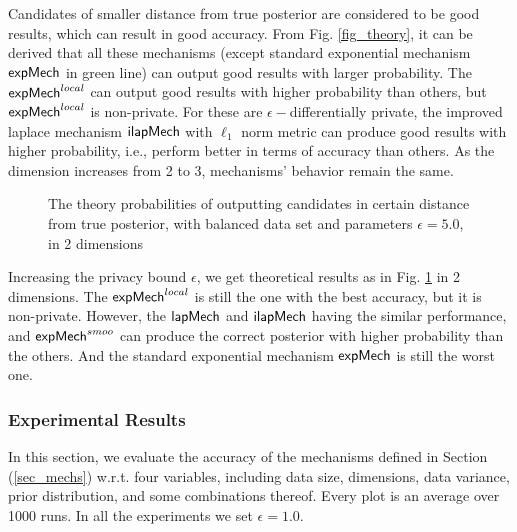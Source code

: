 \documentclass{article}
\begin{document}
Candidates of smaller distance from true posterior are considered to be good results, which can result in good accuracy. From Fig. \ref{fig_theory}, it can be derived that all these mechanisms (except standard exponential mechanism $\mathsf{expMech}$ in green line) can output good results with larger probability. The $\mathsf{expMech}^{local}$ can output good results with higher probability than others, but $\mathsf{expMech}^{local}$ is non-private. For these are $\epsilon -$differentially private, the improved laplace mechanism $\mathsf{ilapMech}$ with $\ell_1$ norm metric can produce good results with higher probability, i.e., perform better in terms of accuracy than others. As the dimension increases from 2 to 3, mechanisms' behavior remain the same.

\begin{figure}
\begin{center}
\centering
\caption{The theory probabilities of outputting candidates in certain distance from true posterior, with balanced data set and parameters $\epsilon = 5.0$, in 2 dimensions}
\label{fig_theory_epsilon}
\end{center}
\end{figure}

Increasing the privacy bound $\epsilon$, we get theoretical results as in Fig. \ref{fig_theory_epsilon} in 2 dimensions. The $\mathsf{expMech}^{local}$ is still the one with the best accuracy, but it is non-private. However, the $\mathsf{lapMech}$ and $\mathsf{ilapMech}$ having the similar performance, and $\mathsf{expMech}^{smoo}$ can produce the correct posterior with higher probability than the others. And the standard exponential mechanism $\mathsf{expMech}$ is still the worst one.


\subsubsection{Experimental Results}
\label{subsec_vs_variables}

In this section, we evaluate the accuracy of the mechanisms defined in
Section (\ref{sec_mechs}) w.r.t. four variables, including data size, dimensions,
data variance, prior distribution, and some combinations thereof.
Every plot is an average over 1000 runs. In all the experiments we set
$\epsilon = 1.0$.
\end{document}
